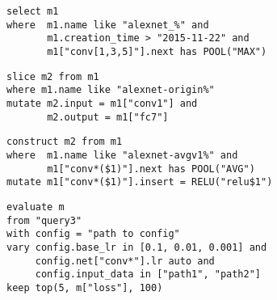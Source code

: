 \documentclass[conference]{IEEEtran}
\begin{document}
\begin{figure}
\begin{lstlisting}[caption={\DQL\ \cmd{select} query to pick the models.\quad\quad\quad\quad\quad\quad\quad\quad\quad\quad\quad}, label=dql:select]
select m1
where  m1.name like "alexnet_%" and
       m1.creation_time > "2015-11-22" and
       m1["conv[1,3,5]"].next has POOL("MAX")
\end{lstlisting}


\begin{lstlisting}[caption={\DQL\ \cmd{slice} query to get a sub-network.\quad\quad\quad\quad\quad\quad\quad\quad\quad\quad}, label=dql:slice]
slice m2 from m1
where m1.name like "alexnet-origin%"
mutate m2.input = m1["conv1"] and
       m2.output = m1["fc7"]
\end{lstlisting}

\begin{lstlisting}[caption={\DQL\ \cmd{construct} query to derive more models on existing ones.\quad}, label=dql:construct]
construct m2 from m1
where  m1.name like "alexnet-avgv1%" and 
       m1["conv*($1)"].next has POOL("AVG")
mutate m1["conv*($1)"].insert = RELU("relu$1")
\end{lstlisting}


\begin{lstlisting}[caption={\DQL\ \cmd{evaluate} query to enumerate models with different network architectures, search hyper-parameters, and eliminate models.}, label=dql:eval]
evaluate m
from "query3"
with config = "path to config"
vary config.base_lr in [0.1, 0.01, 0.001] and
     config.net["conv*"].lr auto and
     config.input_data in ["path1", "path2"]
keep top(5, m["loss"], 100)
\end{lstlisting}
\end{figure}
\end{document}
